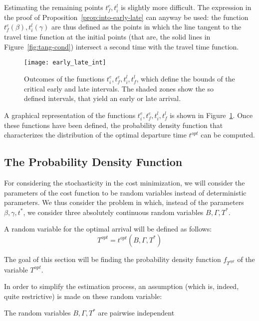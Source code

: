 Estimating the remaining points \(t_f^e, t_i^l\) is slightly more difficult.
The expression in the proof of Proposition~\ref{prop:into-early-late} can anyway be used:
the function \(t_f^e(\beta), t_i^l(\gamma)\)
are thus defined as the points in which the line tangent to the travel time function at the initial points
(that are, the solid lines in Figure~\ref{fig:tang-cond})
intersect a second time with the travel time function.

\begin{figure}
  \centering
  \texttt{[image: early\_late\_int]}
  \caption{Outcomes of the functions \(t_i^e, t_f^e, t_i^l, t_f^l\),
    which define the bounds of the critical early and late intervals.
    The shaded zones show the so defined intervals,
  that yield an early or late arrival.}
  \label{fig:early-late-int}
\end{figure}

A graphical representation of the functions \(t_i^e, t_f^e, t_i^l, t_f^l\) is shown in Figure~\ref{fig:early-late-int}.
Once these functions have been defined,
the probability density function that characterizes the distribution of the optimal departure time \(t^{opt}\) can be computed.

\subsection{The Probability Density Function}

For considering the stochasticity in the cost minimization,
we will consider the parameters of the cost function to be random variables instead of deterministic parameters.
We thus consider the problem in which,
instead of the parameters \(\beta, \gamma, t^*\),
we consider three absolutely continuous random variables \(B, \Gamma, T^*\).

A random variable for the optimal arrival will be defined as follows:
\begin{equation}
  \label{eq:rv-opt-arr}
  T^{opt} = t^{opt}(B, \Gamma, T^*)
\end{equation}

The goal of this section will be finding the probability density function \(f_{T^{opt}}\) of the variable \(T^{opt}\).

In order to simplify the estimation process, an assumption (which is, indeed, quite restrictive)
is made on these random variable:

\begin{assumption}
  The random variables \(B, \Gamma, T^*\) are pairwise independent
\end{assumption}

